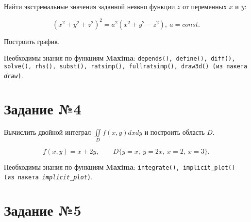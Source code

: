 	Найти экстремальные значения заданной неявно функции $z$ от переменных $x$ и $y$:

	\[
		\left( x^{2} + y^{2} + z^{2} \right)^{2} = a^{2} \left( x^{2} + y^{2} - z^{2} \right), \: a = const.
	\]

	Построить график.

	Необходимы знания по функциям \textbf{Maxima}: {\tt depends(), define(), diff(), solve(), rhs(), subst(), ratsimp(), fullratsimp(), draw3d() (из пакета \textit{draw})}.

\section*{Задание №4}

    Вычислить двойной интеграл $\iint\limits_{D} f(x,y) dx dy$ и построить область $D$.

    \[
        f(x,y) = x + 2 y, \qquad D \{ y = x, \: y = 2 x, \: x = 2, \: x = 3 \}.
    \]

    Необходимы знания по функциям \textbf{Maxima}: {\tt integrate(), implicit\_plot() (из пакета \textit{implicit\_plot})}.

%
%
%
%

\section*{Задание №5}

